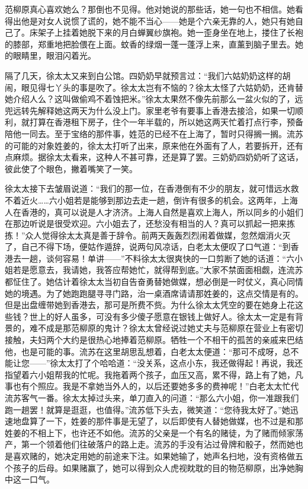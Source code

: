 \par 范柳原真心喜欢她么？那倒也不见得。他对她说的那些话，她一句也不相信。她看得出他是对女人说惯了谎的，她不能不当心——她是个六亲无靠的人，她只有她自己了。床架子上挂着她脱下来的月白蝉翼纱旗袍。她一歪身坐在地上，搂住了长袍的膝部，郑重地把脸偎在上面。蚊香的绿烟一蓬一蓬浮上来，直薰到脑子里去。她的眼睛里，眼泪闪着光。
\par 隔了几天，徐太太又来到白公馆。四奶奶早就预言过：“我们六姑奶奶这样的胡闹，眼见得七丫头的事是吹了。徐太太岂有不恼的？徐太太怪了六姑奶奶，还肯替她介绍人么？这叫做偷鸡不着蚀把米。”徐太太果然不像先前那么一盆火似的了，远兜远转先解释她这两天为什么没上门。家里老爷有要事上香港去接洽，如果一切顺利，就打算在香港租下房子，住个一年半载的，所以她这两天忙着打点行李，预备陪他一同去。至于宝络的那件事，姓范的已经不在上海了，暂时只得搁一搁。流苏的可能的对象姓姜的，徐太太打听了出来，原来他在外面有了人，若要拆开，还有点麻烦。据徐太太看来，这种人不甚可靠，还是算了罢。三奶奶四奶奶听了这话，彼此使了个眼色，撇着嘴笑了一笑。
\par 徐太太接下去皱眉说道：“我们的那一位，在香港倒有不少的朋友，就可惜远水救不着近火……六小姐若是能够到那边去走一趟，倒许有很多的机会。这两年，上海人在香港的，真可以说是人才济济。上海人自然是喜欢上海人，所以同乡的小姐们在那边听说是很受欢迎。六小姐去了，还愁没有相当的人？真可以抓起一把来拣拣！”众人觉得徐太太真是善于辞令。前两天轰轰烈烈闹着做媒，忽然烟消火灭了，自己不得下场，便姑作遁辞，说两句风凉话，白老太太便叹了口气道：“到香港去一趟，谈何容易！单讲——”不料徐太太很爽快的一口剪断了她的话道：“六小姐若是愿意去，我请她，我答应帮她忙，就得帮到底。”大家不禁面面相觑，连流苏都怔住了。她估计着徐太太当初自告奋勇替她做媒，想必倒是一时仗义，真心同情她的境遇。为了她跑跑腿寻寻门路，治一桌酒席请请那姓姜的，这点交情是有的。但是出盘缠带她到香港去，那可是所费不赀。为什么徐太太凭空的要在她身上花这些钱？世上的好人虽多，可没有多少傻子愿意在银钱上做好人。徐太太一定是有背景的，难不成是那范柳原的鬼计？徐太太曾经说过她丈夫与范柳原在营业上有密切接触，夫妇两个大约是很热心地捧着范柳原。牺牲一个不相干的孤苦的亲戚来巴结他，也是可能的事。流苏在这里胡思乱想着，白老太太便道：“那可不成呀，总不能让您——”徐太太打了个哈哈道：“没关系，这点小东，我还做得起！再说，我还指望着六小姐帮我的忙呢。我拖着两个孩子，血压又高，累不得，路上有了她，凡事也有个照应。我是不拿她当外人的，以后还要她多多的费神呢！”白老太太忙代流苏客气一番。徐太太掉过头来，单刀直入的问道：“那么六小姐，你一准跟我们跑一趟罢！就算是逛逛，也值得。”流苏低下头去，微笑道：“您待我太好了。”她迅速地盘算了一下，姓姜的那件事是无望了，以后即使有人替她做媒，也不过是和那姓姜的不相上下，也许还不如他。流苏的父亲是一个有名的赌徒，为了赌而倾家荡产，第一个领着他们往破落户的路上走。流苏的手没有沾过骨牌和骰子，然而她也是喜欢赌的，她决定用她的前途来下注。如果她输了，她声名扫地，没有资格做五个孩子的后母。如果赌赢了，她可以得到众人虎视眈耽的目的物范柳原，出净她胸中这一口气。
